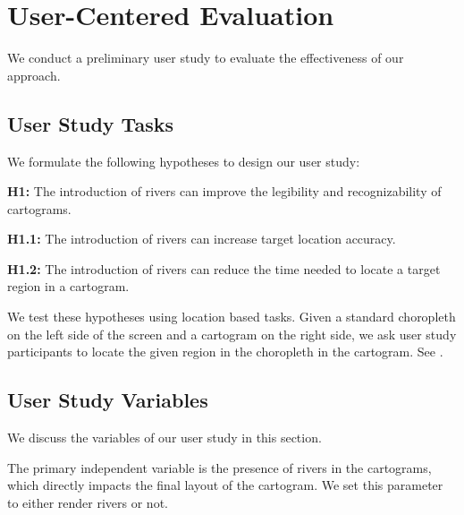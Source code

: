 \newcommand{\pCount}{24 }
\section{User-Centered Evaluation}

We conduct a preliminary user study to evaluate the effectiveness of our approach.

\subsection{User Study Tasks}

We formulate the following hypotheses to design our user study:

\textbf{H1:} The introduction of rivers can improve the legibility and recognizability of cartograms.

\textbf{H1.1:} The introduction of rivers can increase target location accuracy.

\textbf{H1.2:} The introduction of rivers can reduce the time needed to locate a target region in a cartogram.

We test these hypotheses using location based tasks. Given a standard choropleth on the left side of the screen and a cartogram on the right side, we ask user study participants to locate the given region in the choropleth in the cartogram. See .

\subsection{User Study Variables}

We discuss the variables of our user study in this section.

The primary independent variable is the presence of rivers in the cartograms, which directly impacts the final layout of the cartogram. We set this parameter to either render rivers or not.



